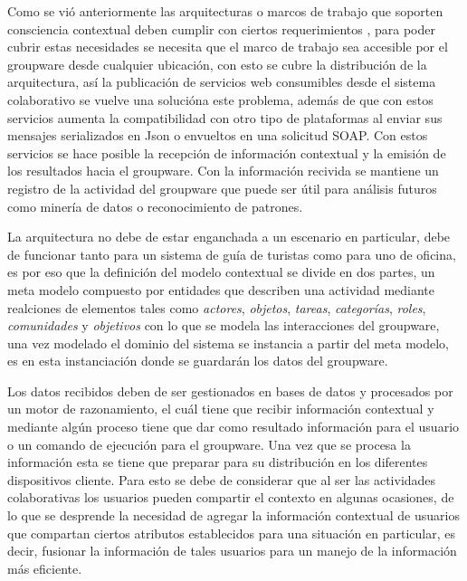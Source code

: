 
Como se vi\'o anteriormente las arquitecturas o marcos de trabajo que soporten consciencia contextual deben cumplir con ciertos requerimientos \cite{dey1999architecture}, para poder cubrir estas necesidades se necesita que el marco de trabajo sea accesible por el groupware desde cualquier ubicaci\'on, con esto se cubre la distribuci\'on de la arquitectura, as\'i la publicaci\'on de servicios web consumibles desde el sistema colaborativo se vuelve una soluci\'ona este problema, adem\'as de que con estos servicios aumenta la compatibilidad con otro tipo de plataformas al enviar sus mensajes serializados en Json o envueltos en una solicitud SOAP. Con estos servicios se hace posible la recepci\'on de informaci\'on contextual y la emisi\'on de los resultados hacia el groupware. Con la informaci\'on recivida se mantiene un registro de la actividad del groupware que puede ser \'util para an\'alisis futuros como miner\'ia de datos o reconocimiento de patrones.

La arquitectura no debe de estar enganchada a un escenario en particular, debe de funcionar tanto para un sistema de gu\'ia de turistas como para uno de oficina, es por eso que la definici\'on del modelo contextual se divide en dos partes, un meta modelo compuesto por entidades que describen una actividad mediante realciones de elementos tales como \textit{actores}, \textit{objetos}, \textit{tareas}, \textit{categor\'ias}, \textit{roles}, \textit{comunidades} y \textit{objetivos} con lo que se modela las interacciones del groupware, una vez modelado el dominio del sistema se instancia a partir del meta modelo, es en esta instanciaci\'on donde se guardar\'an los datos del groupware.

Los datos recibidos deben de ser gestionados en bases de datos y procesados por un motor de razonamiento, el cu\'al tiene que recibir informaci\'on contextual y mediante alg\'un proceso tiene que dar como resultado informaci\'on para el usuario o un comando de ejecuci\'on para el groupware. Una vez que se procesa la informaci\'on esta se tiene que preparar para su distribuci\'on en los diferentes dispositivos cliente. Para esto se debe de considerar que al ser las actividades colaborativas los usuarios pueden compartir el contexto en algunas ocasiones, de lo que se desprende la necesidad de agregar la informaci\'on contextual de usuarios que compartan ciertos atributos establecidos para una situaci\'on en particular, es decir, fusionar la informaci\'on de tales usuarios para un manejo de la informaci\'on m\'as eficiente.

